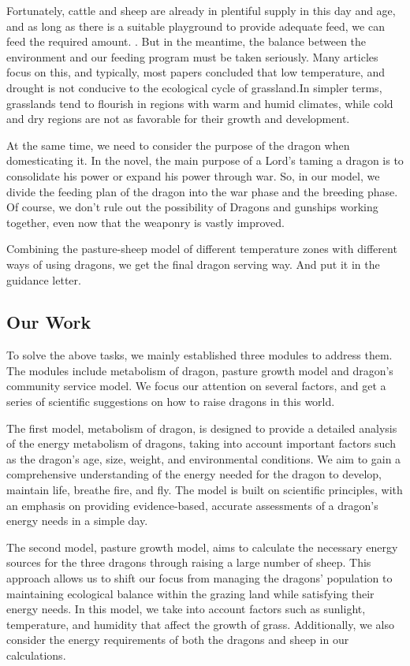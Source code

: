 \documentclass[12pt]{article}  %
\begin{document}
Fortunately, cattle and sheep are already in plentiful supply in this day and age, and as long as there is a suitable playground to provide adequate feed, we can feed the required amount. {\cite{12}}. But in the meantime, the balance between the environment and our feeding program must be taken seriously. Many articles focus on this{\cite{13}}{\cite{14}}{\cite{15}}, and typically, most papers concluded that low temperature, and drought is not conducive to the ecological cycle of grassland{\cite{16}}.In simpler terms, grasslands tend to flourish in regions with warm and humid climates, while cold and dry regions are not as favorable for their growth and development.

At the same time, we need to consider the purpose of the dragon when domesticating it. In the novel, the main purpose of a Lord's taming a dragon is to consolidate his power or expand his power through war. So, in our model, we divide the feeding plan of the dragon into the war phase and the breeding phase. Of course, we don't rule out the possibility of Dragons and gunships working together, even now that the weaponry is vastly improved.

Combining the pasture-sheep model of different temperature zones with different ways of using dragons, we get the final dragon serving way. And put it in the guidance letter.

\subsection{Our Work}
\vspace{-0.3cm}
To solve the above tasks, we mainly established three modules to address them. The modules include metabolism of dragon, pasture growth model and dragon's community service model. We  focus our attention on several factors, and get a series of scientific suggestions on how to raise dragons in this world.

The first model, metabolism of dragon, is designed to provide a detailed analysis of the energy metabolism of dragons, taking into account important factors such as the dragon's age, size, weight, and environmental conditions. We aim to gain a comprehensive understanding of the energy needed for the dragon to develop, maintain life, breathe fire, and fly. The model is built on scientific principles, with an emphasis on providing evidence-based, accurate assessments of a dragon's energy needs in a simple day.

The second model, pasture growth model, aims to calculate the necessary energy sources for the three dragons through raising a large number of sheep. This approach allows us to shift our focus from managing the dragons' population to maintaining ecological balance within the grazing land while satisfying their energy needs. In this model, we take into account factors such as sunlight, temperature, and humidity that affect the growth of grass. Additionally, we also consider the energy requirements of both the dragons and sheep in our calculations.
\end{document}
